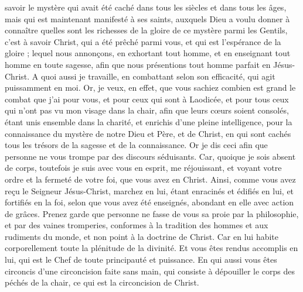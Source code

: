 \begin{multicols}{2}
savoir le mystère qui avait été caché dans tous les siècles et dans tous les âges, mais qui est maintenant manifesté à ses saints,
auxquels Dieu a voulu donner à connaître quelles sont les richesses de la gloire de ce mystère parmi les Gentils, c'est à savoir Christ, qui a été prêché parmi vous, et qui est l'espérance de la gloire ; 
lequel nous annonçons, en exhortant tout homme, et en enseignant tout homme en toute sagesse, afin que nous présentions tout homme parfait en Jésus-Christ.
A quoi aussi je travaille, en combattant selon son efficacité, qui agit puissamment en moi.
\VerseOne{}Or, je veux, en effet, que vous sachiez combien est grand le combat que j'ai pour vous, et pour ceux qui sont à Laodicée, et pour tous ceux qui n'ont pas vu mon visage dans la chair,
afin que leurs cœurs soient consolés, étant unis ensemble dans la charité, et enrichis d'une pleine intelligence, pour la connaissance du mystère de notre Dieu et Père, et de Christ,
en qui sont cachés tous les trésors de la sagesse et de la connaissance.
Or je dis ceci afin que personne ne vous trompe par des discours séduisants.
Car, quoique je sois absent de corps, toutefois je suis avec vous en esprit, me réjouissant, et voyant votre ordre et la fermeté de votre foi, que vous avez en Christ.
Ainsi, comme vous avez reçu le Seigneur Jésus-Christ, marchez en lui,
étant enracinés et édifiés en lui, et fortifiés en la foi, selon que vous avez été enseignés, abondant en elle avec action de grâces.
Prenez garde que personne ne fasse de vous sa proie par la philosophie, et par des vaines tromperies, conformes à la tradition des hommes et aux rudiments du monde, et non point à la doctrine de Christ.
Car en lui habite corporellement toute la plénitude de la divinité.
Et vous êtes rendus accomplis en lui, qui est le Chef de toute principauté et puissance.
En qui aussi vous êtes circoncis d'une circoncision faite sans main, qui consiste à dépouiller le corps des péchés de la chair, ce qui est la circoncision de Christ.

\end{multicols}
